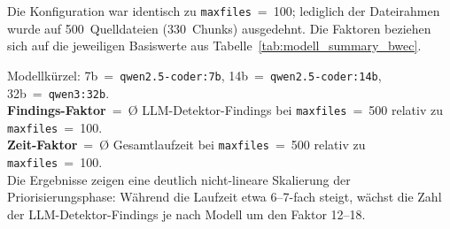 \clearpage

\label{app:modell_summary_bwec500}

\noindent Die Konfiguration war identisch zu \texttt{maxfiles}~=~100; lediglich der Dateirahmen wurde auf 500~Quelldateien (330~Chunks) ausgedehnt. Die Faktoren beziehen sich auf die jeweiligen Basiswerte aus Tabelle~\ref{tab:modell_summary_bwec}.

\begin{table}[htbp]
\centering
\setlength{\tabcolsep}{4pt}
\renewcommand{\arraystretch}{1.25}
\caption[Modell-Leistungsvergleich \ac{BWEC} (\texttt{maxfiles}=500)]{Zusammenfassung der Leistungsmetriken für die drei evaluierten Modelle auf dem realen Untersuchungsobjekt \ac{BWEC} bei \texttt{maxfiles}~=~500.}
%
\label{tab:modell_summary_bwec500}
\end{table}

{\footnotesize\noindent
Modellkürzel: 7b~=~\texttt{qwen2.5-coder:7b}, 14b~=~\texttt{qwen2.5-coder:14b}, 32b~=~\texttt{qwen3:32b}.\\
\textbf{Findings-Faktor}~=~Ø \ac{LLM}-Detektor-Findings bei \texttt{maxfiles}~=~500 relativ zu \texttt{maxfiles}~=~100.\\
\textbf{Zeit-Faktor}~=~Ø Gesamtlaufzeit bei \texttt{maxfiles}~=~500 relativ zu \texttt{maxfiles}~=~100.\\
Die Ergebnisse zeigen eine deutlich nicht-lineare Skalierung der Priorisierungsphase: Während die Laufzeit etwa 6--7-fach steigt, wächst die Zahl der \ac{LLM}-Detektor-Findings je nach Modell um den Faktor 12--18.
}




